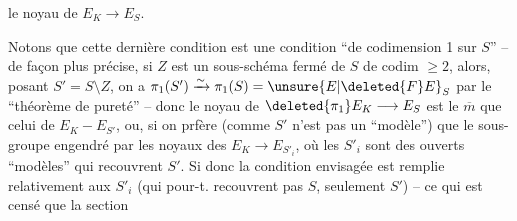 le noyau de $E_K\longrightarrow E_S$.

Notons que cette dernière condition est une condition ``de codimension 1 sur $S$'' -- de façon plus précise, si $Z$ est un sous-schéma fermé de $S$ de codim $\geq 2$,  alors, posant $S'=S\setminus Z$, on a $\pi_1(S')\xrightarrow{\sim}\pi_1(S)=\unsure{E|\deleted{F}E}_S$ par le ``théorème de pureté'' -- donc le noyau de $\deleted{\pi_1}E_K\longrightarrow E_S$ est le $\overline{m}$ que celui de $E_K-E_{S'}$, ou, si on prfère (comme $S'$ n'est pas un ``modèle'') que le sous-groupe  engendré par les noyaux des $E_K\longrightarrow E_{S'_i}$, où les $S'_i$ sont des ouverts ``modèles'' qui recouvrent $S'$. Si donc la condition envisagée est remplie relativement aux $S'_i$ (qui pour-t.   recouvrent pas $S$, seulement $S'$) -- ce qui est censé  que la section
